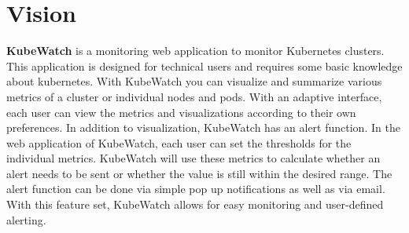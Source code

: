 \chapter{Vision}



\textbf{KubeWatch} is a monitoring web application to monitor Kubernetes clusters. This application is designed for technical users and requires some basic knowledge about kubernetes. With KubeWatch you can visualize and summarize various metrics of a cluster or individual nodes and pods. With an adaptive interface, each user can view the metrics and visualizations according to their own preferences. In addition to visualization, KubeWatch has an alert function. In the web application of KubeWatch, each user can set the thresholds for the individual metrics. KubeWatch will use these metrics to calculate whether an alert needs to be sent or whether the value is still within the desired range. The alert function can be done via simple pop up notifications as well as via email. With this feature set, KubeWatch allows for easy monitoring and user-defined alerting.